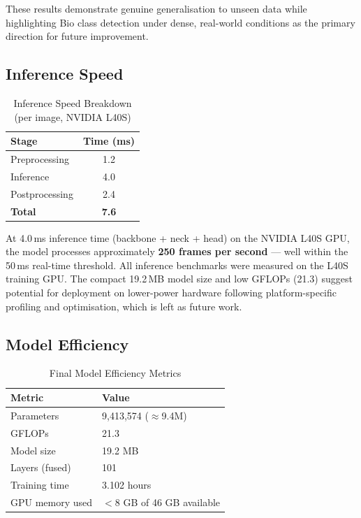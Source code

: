 These results demonstrate genuine generalisation to unseen data while highlighting Bio class detection under dense, real-world conditions as the primary direction for future improvement.

\subsection{Inference Speed}

\begin{table}[H]
\centering
\caption{Inference Speed Breakdown (per image, NVIDIA L40S)}
\label{tab:speed}
\begin{tabular}{lc}
\toprule
\textbf{Stage} & \textbf{Time (ms)} \\
\midrule
Preprocessing  & 1.2 \\
Inference      & 4.0 \\
Postprocessing & 2.4 \\
\midrule
\textbf{Total} & \textbf{7.6} \\
\bottomrule
\end{tabular}
\end{table}

At 4.0\,ms inference time (backbone + neck + head) on the NVIDIA L40S GPU, the model processes approximately \textbf{250 frames per second} — well within the 50\,ms real-time threshold. All inference benchmarks were measured on the L40S training GPU. The compact 19.2\,MB model size and low GFLOPs (21.3) suggest potential for deployment on lower-power hardware following platform-specific profiling and optimisation, which is left as future work.

\subsection{Model Efficiency}

\begin{table}[H]
\centering
\caption{Final Model Efficiency Metrics}
\label{tab:efficiency}
\begin{tabular}{ll}
\toprule
\textbf{Metric} & \textbf{Value} \\
\midrule
Parameters       & 9,413,574 ($\approx$9.4M) \\
GFLOPs           & 21.3 \\
Model size       & 19.2 MB \\
Layers (fused)   & 101 \\
Training time    & 3.102 hours \\
GPU memory used  & $<$8 GB of 46 GB available \\
\bottomrule
\end{tabular}
\end{table}

